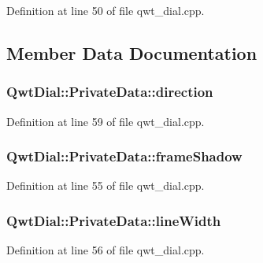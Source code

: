 Definition at line 50 of file qwt\-\_\-dial.\-cpp.



\subsection{Member Data Documentation}
\hypertarget{class_qwt_dial_1_1_private_data_a30cbc0768020d8e58461be2735c0350b}{
\subsubsection[{direction}]{ Qwt\-Dial\-::\-Private\-Data\-::direction}}\label{class_qwt_dial_1_1_private_data_a30cbc0768020d8e58461be2735c0350b}


Definition at line 59 of file qwt\-\_\-dial.\-cpp.

\hypertarget{class_qwt_dial_1_1_private_data_a24a6effafc917bf81673052c1963de0f}{
\subsubsection[{frame\-Shadow}]{ Qwt\-Dial\-::\-Private\-Data\-::frame\-Shadow}}\label{class_qwt_dial_1_1_private_data_a24a6effafc917bf81673052c1963de0f}


Definition at line 55 of file qwt\-\_\-dial.\-cpp.

\hypertarget{class_qwt_dial_1_1_private_data_a03b08843ed21ca31908783d3f9984117}{
\subsubsection[{line\-Width}]{ Qwt\-Dial\-::\-Private\-Data\-::line\-Width}}\label{class_qwt_dial_1_1_private_data_a03b08843ed21ca31908783d3f9984117}


Definition at line 56 of file qwt\-\_\-dial.\-cpp.


